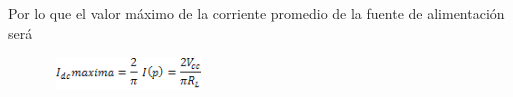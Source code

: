 \documentclass[12pt]{article}
\begin{document}
\par

Por lo que el valor máximo de la corriente promedio de la fuente de alimentación será\par




\begin{figure}[H]
	\begin{Center}
		\includegraphics[width=1.67in,height=0.33in]{./media/image32.gif}
	\end{Center}
\end{figure}



\par


\vspace{\baselineskip}

\printbibliography
\end{document}
